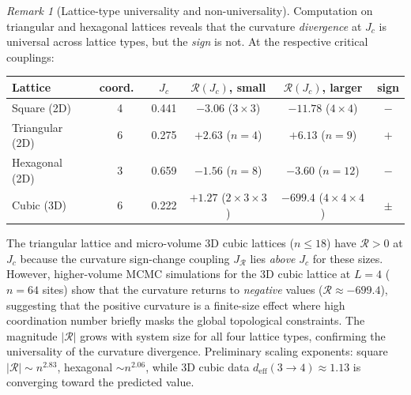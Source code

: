 \documentclass[11pt]{article}
\theoremstyle{definition}
\theoremstyle{remark}
\newtheorem{remark}[theorem]{Remark}
\newcommand{\Scal}{\mathcal{R}}
\begin{document}
\begin{remark}[Lattice-type universality and non-universality]
\label{rem:lattice-types}
Computation on triangular and hexagonal lattices reveals that the curvature
\emph{divergence} at $J_c$ is universal across lattice types, but the
\emph{sign} is not. At the respective critical couplings:
\begin{center}
\renewcommand{\arraystretch}{1.15}
\begin{tabular}{lccccc}
\toprule
Lattice & coord.\ & $J_c$ & $\Scal(J_c)$, small & $\Scal(J_c)$, larger & sign \\
\midrule
Square (2D) & 4 & 0.441 & $-3.06$ ($3{\times}3$) & $-11.78$ ($4{\times}4$) & $-$ \\
Triangular (2D) & 6 & 0.275 & $+2.63$ ($n{=}4$) & $+6.13$ ($n{=}9$) & $+$ \\
Hexagonal (2D) & 3 & 0.659 & $-1.56$ ($n{=}8$) & $-3.60$ ($n{=}12$) & $-$ \\
Cubic (3D) & 6 & 0.222 & $+1.27$ ($2{\times}3{\times}3$) & $-699.4$ ($4{\times}4{\times}4$) & $\pm$ \\
\bottomrule
\end{tabular}
\end{center}
The triangular lattice and micro-volume 3D cubic lattices ($n \leq 18$) have $\Scal > 0$ at $J_c$
because the curvature sign-change coupling $J_{\Scal}$ lies \emph{above} $J_c$
for these sizes. However, higher-volume MCMC simulations for the 3D cubic
lattice at $L = 4$ ($n = 64$ sites) show that the curvature returns to
\emph{negative} values ($\Scal \approx -699.4$), suggesting that the positive
curvature is a finite-size effect where high coordination number briefly masks
the global topological constraints.
The magnitude $|\Scal|$ grows with system size for all four lattice types,
confirming the universality of the curvature divergence.
Preliminary scaling exponents: square $|\Scal| \sim n^{2.83}$,
hexagonal $\sim n^{2.06}$, while 3D cubic data $d_{\mathrm{eff}}(3 \to 4) \approx 1.13$
is converging toward the predicted value.
\end{remark}
\end{document}
